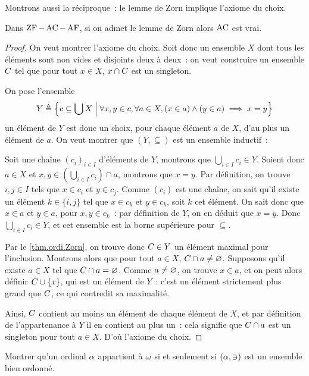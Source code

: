 \noindent
Montrons aussi la réciproque~: le lemme de Zorn implique l'axiome du choix.

\begin{proposition}
  Dans $\operatorname{ZF} - \operatorname{AC} - \operatorname{AF}$, si on admet le lemme de Zorn alors $\operatorname{AC}$ est vrai.
\end{proposition}

\begin{proof}
  On veut montrer l'axiome du choix. Soit donc un ensemble $X$ dont tous les
  éléments sont non vides et disjoints deux à deux~: on veut construire un
  ensemble $C$ tel que pour tout $x \in X$, $x\cap C$ est un
  singleton.

  On pose l'ensemble
  \[Y \triangleq \left\{ c \subseteq \bigcup X \;\middle\vert\; \forall x,y \in c,
    \forall a \in X, (x \in a)\land (y \in a) \implies x = y \right\}\]
  un élément de $Y$ est donc un choix, pour chaque élément $a$ de $X$, d'au
  plus un élément de $a$. On veut montrer que $(Y,\subseteq)$ est un ensemble
  inductif~:

  Soit une chaîne $(c_i)_{i\in I}$ d'éléments de $Y$, montrons que
  $\displaystyle\bigcup_{i\in I} c_i\in Y$. Soient donc $a\in X$ et
  $x,y\in\displaystyle\left(\bigcup_{i \in I} c_i\right) \cap a$, montrons que
  $x = y$. Par définition, on trouve $i,j \in I$ tels que $x \in c_i$ et
  $y\in c_j$. Comme $(c_i)$ est une chaîne, on sait qu'il existe un élément
  $k\in\{i,j\}$ tel que $x\in c_k$ et $y\in c_k$, soit $k$ cet élément. On sait
  donc que $x\in a$ et $y\in a$, pour $x,y\in c_k$~: par définition de $Y$, on
  en déduit que $x = y$. Donc $\displaystyle\bigcup_{i\in I} c_i\in Y$, et
  cet ensemble est la borne supérieure pour $\subseteq$.

  Par le \cref{thm.ordi.Zorn}, on trouve donc $C \in Y$ un élément maximal
  pour l'inclusion. Montrons alors que pour tout $a \in X$,
  $C \cap a \neq\varnothing$. Supposons qu'il existe $a \in X$ tel que
  $C\cap a = \varnothing$. Comme $a\neq\varnothing$, on trouve $x \in a$, et
  on peut alors définir $C \cup \{x\}$, qui est un élément de $Y$~: c'est
  un élément strictement plus grand que $C$, ce qui contredit sa
  maximalité.

  Ainsi, $C$ contient au moins un élément de chaque élément de $X$, et par
  définition de l'appartenance à $Y$ il en contient au plus un~: cela signifie
  que $C\cap a$ est un singleton pour tout $a \in X$. D'où l'axiome du
  choix.
\end{proof}

\begin{exercise}
  Montrer qu'un ordinal $\alpha$ appartient à $\omega$ si et seulement si
  $(\alpha,\ni)$ est un ensemble bien ordonné.
\end{exercise}

